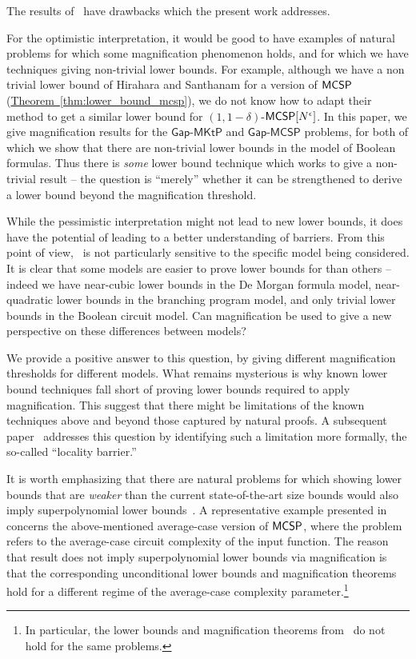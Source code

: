 \documentclass[11pt]{article}
\numberwithin{equation}{section}
\theoremstyle{definition}
\theoremstyle{plain}
\newcommand{\expref}[2]{\hyperref[#2]{#1~\ref{#2}}}
\newcommand{\MCSP}{\ensuremath{{\sf MCSP}}\xspace}
\newcommand{\gapmktp}{\mathsf{Gap}$-$\mathsf{MKtP}}
\newcommand{\gapmcsp}{\mathsf{Gap}$-$\mathsf{MCSP}}
\begin{document}
The results of~\cite{OS18} have drawbacks which the present work addresses.

For the optimistic interpretation, it would be good to have examples of natural problems for which some magnification phenomenon holds, and for which we have techniques giving non-trivial lower bounds. For example, although we have a non trivial lower bound of Hirahara and Santhanam for a version of \MCSP (\expref{Theorem}{thm:lower_bound_mcsp}), we do not know how to adapt their method to get a similar lower bound for $(1,1-\delta)$-$\MCSP[N^{\epsilon}]$. In this
%
paper,   %
we give magnification results for the $\gapmktp$ and $\gapmcsp$ problems, for both of which we show that there are non-trivial lower bounds in the model of Boolean formulas. Thus there is \emph{some} lower bound technique which works to give a non-trivial result -- the question is ``merely'' whether it can be strengthened to derive a lower bound beyond the magnification threshold. 

While the pessimistic interpretation might not lead to new lower bounds, it does have the potential of leading to a better understanding of barriers. From this point of view,~\cite{OS18} is not particularly sensitive to the specific model being considered. It is clear that some models are easier to prove lower bounds for than others -- indeed we have near-cubic lower bounds in the De Morgan formula model, near-quadratic lower bounds in the branching program model, and only trivial lower bounds in the Boolean circuit model. Can magnification be used to give a new perspective on these differences between models?

We provide a positive answer to this question, by giving different magnification thresholds for different models. What remains mysterious is why known lower bound techniques fall short of proving lower bounds required to apply magnification. This suggest that there might be limitations of the known techniques above and beyond those captured by natural proofs. A subsequent %
paper~\cite{chen_et_al:LIPIcs:2020:11755} addresses this question by identifying such a limitation more formally, the %
so-called   %
%
%
``locality barrier.''

It is worth emphasizing that there are natural problems for which showing lower bounds that are \emph{weaker} than the current state-of-the-art size bounds would also imply superpolynomial lower bounds~\cite{OS18}. A representative example presented in~\cite{OS18} concerns the above-mentioned average-case version of \MCSP, where the problem refers to the average-case circuit complexity of the input function. The reason that
%
result  %
does not imply superpolynomial lower bounds via magnification is that the corresponding unconditional lower bounds and magnification theorems hold for a different regime of the average-case complexity parameter.\footnote{In particular, the lower bounds and magnification theorems from~\cite{OS18} do not hold for the same problems.}  
\end{document}
